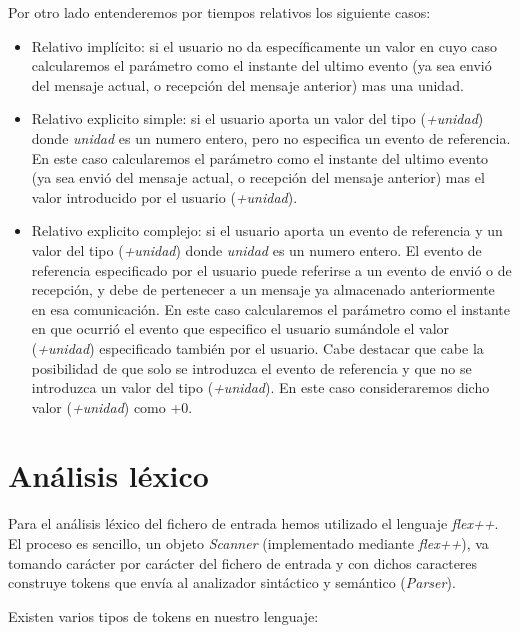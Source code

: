 \documentclass{article}
\begin{document}
Por otro lado entenderemos por tiempos relativos los siguiente casos:

\begin{itemize}
\item Relativo implícito: si el usuario no da específicamente un valor en cuyo caso calcularemos el parámetro como el instante del ultimo evento (ya sea envió del mensaje actual, o recepción del mensaje anterior) mas una unidad.
\item Relativo explicito simple: si el usuario aporta un valor del tipo (\textit{+unidad}) donde \textit{unidad} es un numero entero, pero no especifica un evento de referencia. En este caso calcularemos el parámetro como el instante del ultimo evento (ya sea envió del mensaje actual, o recepción del mensaje anterior) mas el valor introducido por el usuario (\textit{+unidad}).
\item Relativo explicito complejo: si el usuario aporta un evento de referencia y un valor del tipo (\textit{+unidad}) donde \textit{unidad} es un numero entero. El evento de referencia especificado por el usuario puede referirse a un evento de envió o de recepción, y debe de pertenecer a un mensaje ya almacenado anteriormente en esa comunicación. En este caso calcularemos el parámetro como el instante en que ocurrió el evento que especifico el usuario sumándole el valor (\textit{+unidad}) especificado también por el usuario. Cabe destacar que cabe la posibilidad de que solo se introduzca el evento de referencia y que no se introduzca un valor del tipo (\textit{+unidad}). En este caso consideraremos dicho valor (\textit{+unidad}) como +0.
\end{itemize}

\section{Análisis léxico}

Para el análisis léxico del fichero de entrada hemos utilizado el lenguaje \textit{flex++}. El proceso es sencillo, un objeto \textit{Scanner} (implementado mediante \textit{flex++}), va tomando carácter por carácter del fichero de entrada y con dichos caracteres construye tokens que envía al analizador sintáctico y semántico (\textit{Parser}). 

Existen varios tipos de tokens en nuestro lenguaje:
\end{document}
